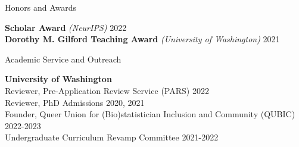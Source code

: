 \documentclass{resume} %
\begin{document}
\begin{rSection}{Honors and Awards}

\textbf{Scholar Award} {\it (NeurIPS)} \hfill {2022}
\\ \textbf{Dorothy M. Gilford Teaching Award} {\it (University of Washington)} \hfill {2021}


\end{rSection}


\begin{rSection}{Academic Service and Outreach}

{\bf University of Washington}
\\ Reviewer,  Pre-Application Review Service (PARS) \hfill {2022}
\\ Reviewer, PhD Admissions \hfill{2020, 2021}
\\ Founder, Queer Union for (Bio)statistician Inclusion and Community (QUBIC) \hfill{2022-2023}
\\ Undergraduate Curriculum Revamp Committee \hfill {2021-2022}

\end{rSection}
\end{document}
